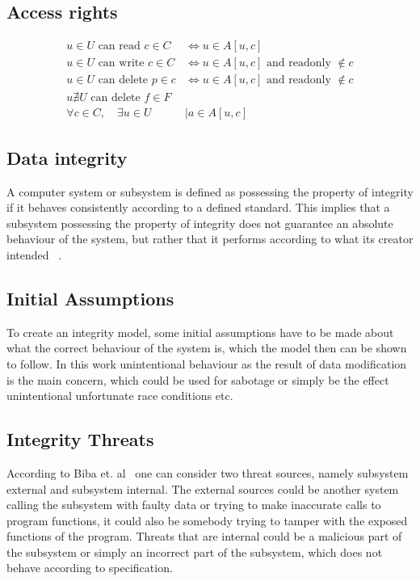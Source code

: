\documentclass[a4paper,12pt]{article}
\newcommand{\Iff}{\Leftrightarrow}
\begin{document}
\subsection{Access rights}
\begin{equation}
    \begin{split}
        u \in U \text{ can read } c \in C & \Iff u \in A[u,c] \\
        u \in U \text{ can write } c \in C & \Iff u \in A[u,c] \text{ and readonly } \notin c \\
        u \in U \text{ can delete } p \in c & \Iff u \in A[u,c] \text{ and readonly } \notin c \\
        u \nexists U \text{ can delete } f \in F \\
        \forall c \in C, \quad \exists u \in U & \mid a \in A[u,c] 
    \end{split}
\end{equation}

\subsection{Data integrity}
A computer system or subsystem is defined as possessing the property of integrity if it behaves consistently
according to a defined standard. This implies that a subsystem possessing the property of integrity
does not guarantee an absolute behaviour of the system, but rather that it performs according to
what its creator intended ~\cite{BIBA}.

\subsection{Initial Assumptions}
To create an integrity model, some initial assumptions have to be made about what the correct behaviour
of the system is, which the model then can be shown to follow. In this work unintentional behaviour
as the result of data modification is the main concern, which could be used for sabotage or simply be the
effect unintentional unfortunate race conditions etc. 

\subsection{Integrity Threats}
According to Biba et. al~\cite{BIBA} one can consider two threat sources, namely subsystem external
and subsystem internal. The external sources could be another system calling the subsystem with
faulty data or trying to make inaccurate calls to program functions, it could also be somebody
trying to tamper with the exposed functions of the program. Threats that are internal could be a
malicious part of the subsystem or simply an incorrect part of the subsystem, which does not behave
according to specification.
\end{document}
